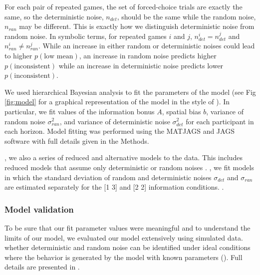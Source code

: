 \documentclass[12pt]{article}
\begin{document}
{For each pair of repeated games, the set of forced-choice trials are exactly the same, so the deterministic noise, $n_{det}$, should be the same while the random noise, $n_{ran}$ may be different. This is exactly how we distinguish deterministic noise from random noise. In symbolic terms, for repeated games $i$ and $j$,  $n_{det}^i=n_{det}^j$  and $n_{ran}^i \neq n_{ran}^j$. While an increase in either random or deterministic noises could lead to higher $p(\mbox{low mean})$, an increase in random noise predicts higher $p(\mbox{inconsistent})$ while an increase in deterministic noise predicts lower $p(\mbox{inconsistent})$. 

We used hierarchical Bayesian analysis to fit the parameters of the model (see Fig \ref{fig:model} for a graphical representation of the model in the style of \cite{lee2014}). In particular, we fit values of the information bonus $A$, spatial bias $b$, variance of random noise $\sigma_{ran}^2$, and variance of deterministic noise $\sigma_{det}^2$ for each participant in each horizon. Model fitting was performed using the MATJAGS and JAGS software \citep{jags, matjags} with full details given in the Methods.  

, we also  a series of reduced and alternative models to the data. This includes reduced models that assume only deterministic or random noises .  , we fit models in which the standard deviation of random and deterministic noises $\sigma_{det}$ and $\sigma_{ran}$ are estimated separately for the [1 3] and [2 2] information conditions. .

\subsubsection*{Model validation}
To be sure that our fit parameter values were meaningful and to understand the limits of our model, we evaluated our model extensively using simulated data.   whether deterministic and random noise can be identified under ideal conditions where the behavior is generated by the model with known parameters (). Full details are presented in . 
	
}
\end{document}
